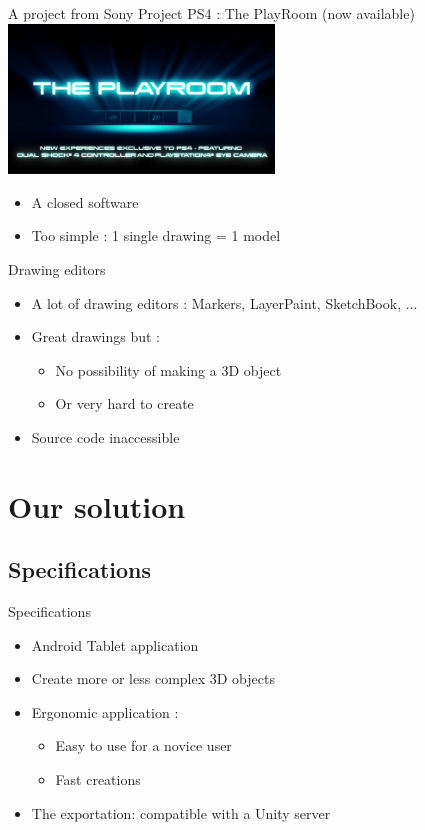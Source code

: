 \documentclass[a4paper,10pt]{beamer}
\begin{document}
		\begin{frame}{A project from Sony}
			Project PS4 : The PlayRoom (now available)
			\href{run:Video_intro_playroom.wmv}{\includegraphics[width=200pt]{images/The-Playroom.jpg}}
			\begin{itemize}
				\item A closed software
				\item Too simple : 1 single drawing = 1 model

			\end{itemize}
		\end{frame}
		
			\begin{frame}{Drawing editors}
				\begin{itemize}
					\item A lot of drawing editors : Markers, LayerPaint, SketchBook, ...
					\item Great drawings but :
					\begin{itemize}
						\item No possibility of making a 3D object
						\item Or very hard to create
					\end{itemize}
					\item Source code inaccessible
				\end{itemize}
			\end{frame}
	
	\section{Our solution}
		\subsection{Specifications}
		
		\begin{frame}{Specifications}
			\begin{itemize}
				\item Android Tablet application
				\item Create more or less complex 3D objects
				\item Ergonomic application :
				\begin{itemize}
					\item Easy to use for a novice user
					\item Fast creations
				\end{itemize}
				\item The exportation: compatible with a Unity server
			\end{itemize}
		\end{frame}
		
\end{document}
